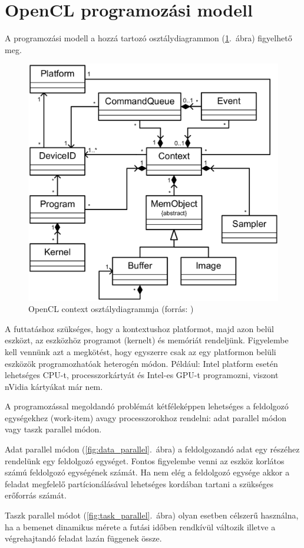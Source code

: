 	
\section{OpenCL programozási modell}
	
	A programozási modell a hozzá tartozó osztálydiagrammon (\ref{fig:class}.~ábra) figyelhető meg.
	
	\begin{figure}[!ht]
		\centering
		\includegraphics[width=0.5\columnwidth]{figures/eps/context.eps}
		\caption{OpenCL context osztálydiagrammja (forrás: \cite{opencl})} 
		\label{fig:class} 
	\end{figure}
	A futtatáshoz szükséges, hogy a kontextushoz platformot, majd azon belül
	eszközt, az eszközhöz programot (kernelt) és memóriát rendeljünk.
	Figyelembe kell vennünk azt a megkötést, hogy egyszerre csak az egy platformon belüli
	eszközök programozhatóak heterogén módon. Például: Intel platform esetén
	lehetséges CPU-t, processzorkártyát és Intel-es GPU-t programozni, viszont nVidia kártyákat már nem.
	
	A programozással megoldandó problémát kétféleképpen lehetséges a feldolgozó
	egységekhez (work-item) avagy processzorokhoz rendelni:
	adat parallel módon vagy taszk parallel módon.
	
	Adat parallel módon (\ref{fig:data_parallel}.~ábra) a feldolgozandó adat egy
	részéhez rendelünk egy feldolgozó egységet. Fontos figyelembe venni az eszköz korlátos
	számú feldolgozó egységének számát. Ha nem elég a feldolgozó egysége akkor a
	feladat megfelelő partícionálásával lehetséges kordában tartani a szükséges
	erőforrás számát.
	
	Taszk parallel módot (\ref{fig:task_parallel}.~ábra) olyan esetben célszerű
	használna, ha a bemenet dinamikus mérete a futási időben rendkívül változik
	illetve a végrehajtandó feladat lazán függenek össze.
	
